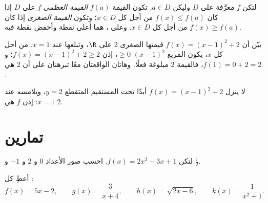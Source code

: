 \begin{definition}\label{def:g10:functions:extrema}
لتكن $f$ معرَّفة على $D$ وليكن $a \in D$. تكون القيمة $f(a)$
\emph{القيمة العظمى}  $f$ على $D$ إذا كان $f(x) \leq f(a)$ من أجل كل
$x \in D$؛ وتكون \emph{القيمة الصغرى} إذا كان
$f(x) \geq f(a)$ من أجل كل $x \in D$. وعلى ، هما أعلى نقطة
وأخفض نقطة فيه.
\end{definition}

\begin{example}\label{ex:g10:functions:extremum}
بيّن أن $f(x) = (x - 1)^2 + 2$ قيمتها الصغرى $2$ على $\R$، وتبلغها عند
$x = 1$. من أجل كل $x$، يكون المربع $(x-1)^2$ $\geq 0$، إذن
$f(x) = (x-1)^2 + 2 \geq 2$؛ و$f(1) = 0 + 2 = 2$، فالقيمة $2$
مبلوغة فعلًا. وهاتان الواقعتان معًا تبرهنان على أن $2$ هي .
\end{example}

\begin{omfigure}

{\small لا ينزل  $f(x) = (x-1)^2 + 2$ أبدًا تحت المستقيم المتقطع
$y = 2$، ويلامسه عند $x = 1$: إذن   $f$ هي $2$.}
\end{omfigure}

\section{تمارين}

\begin{exercise}[$\star$]\label{exo:g10:functions:1}
لتكن $f(x) = 2x^2 - 3x + 1$. احسب صور الأعداد $0$ و $2$ و $-1$ و
$\frac12$.
\end{exercise}

\begin{exercise}[$\star$]\label{exo:g10:functions:2}
أعطِ  كل :
\[
f(x) = 5x - 2, \qquad
g(x) = \frac{3}{x + 4}, \qquad
h(x) = \sqrt{2x - 6}, \qquad
k(x) = \frac{1}{x^2 + 1}.
\]
\end{exercise}

